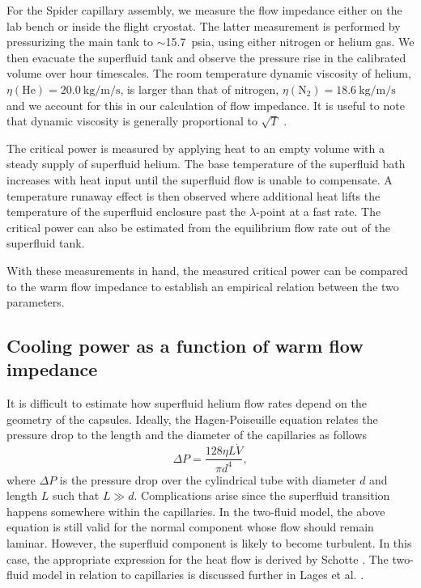 \documentclass[
12pt, %
letterpaper, %
oneside, %
headinclude, footinclude, %
BCOR5mm, %
]{scrartcl}
\newcommand{\lp}{$\lambda$-point }
\newcommand{\spider}{{\sc Spider} }
\newcommand{\mrm}[1]{\mathrm{#1}}
\begin{document}
For the \spider capillary assembly, we measure the flow impedance either on the lab bench or inside the flight cryostat. The latter measurement is performed by pressurizing the main tank to $\sim$15.7~psia, using either nitrogen or helium gas. We then evacuate the superfluid tank and observe the pressure rise in the calibrated volume over hour timescales. The room temperature dynamic viscosity of helium, $\eta (\mrm{He}) = 20.0 \:\mrm{kg/m/s}$, is larger than that of nitrogen, $\eta (\mrm{N_{2}}) = 18.6 \:\mrm{kg/m/s}$ and we account for this in our calculation of flow impedance. It is useful to note that dynamic viscosity is generally proportional to $\sqrt{T}$ \cite{Amdur1947}.

The critical power is measured by applying heat to an empty volume with a steady supply of superfluid helium. The base temperature of the superfluid bath increases with heat input until the superfluid flow is unable to compensate. A temperature runaway effect is then observed where additional heat lifts the temperature of the superfluid enclosure past the \lp at a fast rate. The critical power can also be estimated from the equilibrium flow rate out of the superfluid tank. 

With these measurements in hand, the measured critical power can be compared to the warm flow impedance to establish an empirical relation between the two parameters.

\subsection{Cooling power as a function of warm flow impedance}
\label{sec:hp}

It is difficult to estimate how superfluid helium flow rates depend on the geometry of the capsules. Ideally, the Hagen-Poiseuille equation relates the pressure drop to the length and the diameter of the capillaries as follows
\begin{equation}
\Delta P = \frac{128\eta L\dot{V}}{\pi d^4},
\end{equation}
where $\Delta P$ is the pressure drop over the cylindrical tube with diameter $d$ and length $L$ such that $L \gg d$. Complications arise since the superfluid transition happens somewhere within the capillaries. In the two-fluid model, the above equation is still valid for the normal component whose flow should remain laminar. However, the superfluid component is likely to become turbulent. In this case, the appropriate expression for the heat flow is derived by Schotte \cite{Schotte1984}. The two-fluid model in relation to capillaries is discussed further in Lages et al. \cite{Lages1995}.
\end{document}
